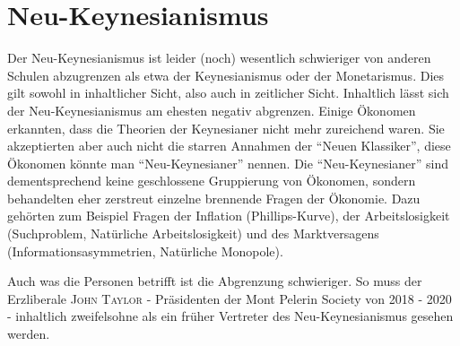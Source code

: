%
%
%

\chapter{Neu-Keynesianismus} \label{cha: Neu Keynes}

Der Neu-Keynesianismus ist leider (noch) wesentlich schwieriger von anderen Schulen abzugrenzen als etwa der Keynesianismus oder der Monetarismus. Dies gilt sowohl in inhaltlicher Sicht, also auch in zeitlicher Sicht. Inhaltlich lässt sich der Neu-Keynesianismus am ehesten negativ abgrenzen. Einige Ökonomen erkannten, dass die Theorien der Keynesianer nicht mehr zureichend waren. Sie akzeptierten aber auch nicht die starren Annahmen der "`Neuen Klassiker"', diese Ökonomen könnte man "`Neu-Keynesianer"' nennen. Die "`Neu-Keynesianer"' sind dementsprechend keine geschlossene Gruppierung von Ökonomen, sondern behandelten eher zerstreut einzelne brennende Fragen der Ökonomie. Dazu gehörten zum Beispiel Fragen der Inflation (Phillips-Kurve), der Arbeitslosigkeit (Suchproblem, Natürliche Arbeitslosigkeit) und des Marktversagens (Informationsasymmetrien, Natürliche Monopole). 

Auch was die Personen betrifft ist die Abgrenzung schwieriger. So muss der Erzliberale \textsc{John Taylor} - Präsidenten der Mont Pelerin Society von 2018 - 2020 - inhaltlich zweifelsohne als ein früher Vertreter des Neu-Keynesianismus gesehen werden. 

